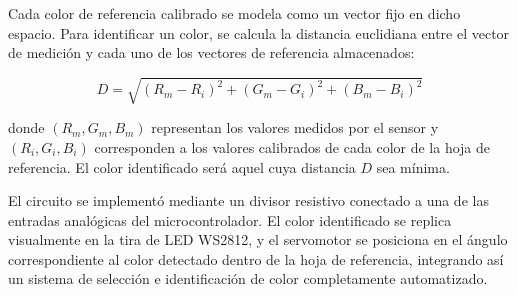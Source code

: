 \vspace{1em}

Cada color de referencia calibrado se modela como un vector fijo en dicho espacio. Para identificar un color, se calcula la distancia euclidiana entre el vector de medición y cada uno de los vectores de referencia almacenados:

\begin{equation}\label{eq:distancia_color}
D = \sqrt{(R_m - R_i)^2 + (G_m - G_i)^2 + (B_m - B_i)^2}
\end{equation}

donde $(R_m, G_m, B_m)$ representan los valores medidos por el sensor y $(R_i, G_i, B_i)$ corresponden a los valores calibrados de cada color de la hoja de referencia. El color identificado será aquel cuya distancia $D$ sea mínima.



\vspace{1em}

El circuito se implementó mediante un divisor resistivo conectado a una de las entradas analógicas del microcontrolador. El color identificado se replica visualmente en la tira de LED WS2812, y el servomotor se posiciona en el ángulo correspondiente al color detectado dentro de la hoja de referencia, integrando así un sistema de selección e identificación de color completamente automatizado.








